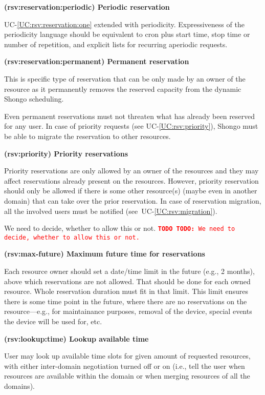\documentclass[a4paper]{report}
\makeatletter
\newcounter{UCcounter}
\newenvironment{UseCases}%
	{\begin{list}{\textbf{UC-\arabic{UCcounter}}}{\@nmbrlisttrue\def\@listctr{UCcounter}}}%
	{\end{list}}
\newcommand{\UClabel}[1]{\label{UC:#1}}
\newcommand{\UCref}[1]{UC-\ref{UC:#1}}
\newcommand{\UseCase}[2]{\item\UClabel{#2} \textbf{(#2) #1}\\ \nopagebreak}
\newcommand{\TODO}[1]{%
\def\empty{}%
\def\prvniparametr{#1}%
\ifx\prvniparametr\empty%
\begingroup\tt\textcolor{red}{\noindent\textbf{TODO}}\endgroup
\else%
\begingroup\tt\textcolor{red}{\noindent\textbf{TODO:}\ #1}\endgroup
\fi%
}
\makeatother
\begin{document}
\begin{UseCases}
\begin{compactitem}
\end{compactitem}



\UseCase{Periodic reservation}{rsv:reservation:periodic}

\UCref{rsv:reservation:one} extended with periodicity. Expressiveness of the
periodicity language should be equivalent to cron plus start time, stop time or number of repetition, and explicit lists for recurring aperiodic requests.

\UseCase{Permanent reservation}{rsv:reservation:permanent}

This is specific type of reservation that can be only made by an owner of the
resource as it permanently removes the reserved capacity from the dynamic
Shongo scheduling.

Even permanent reservations must not threaten what has already been reserved for any user. In case of priority requests (see \UCref{rsv:priority}), Shongo must be able to migrate the reservation to other resources.

\UseCase{Priority reservations}{rsv:priority}

Priority reservations are only allowed by an owner of the resources and they
may affect reservations already present on the resources. However, priority
reservation should only be allowed if there is some other resource(s) (maybe
even in another domain) that can take over the prior reservation. In case of
reservation migration, all the involved users must be notified
(see~\UCref{rsv:migration}).

\TODO{We need to decide, whether to allow this or not.}


\UseCase{Maximum future time for reservations}{rsv:max-future}

Each resource owner should set a date/time limit in the future (e.g., 2
months), above which reservations are not allowed. That should be done for each owned resource. Whole reservation duration
must fit in that limit. This limit ensures there is some time point in the
future, where there are no reservations on the resource---e.g., for
maintainance purposes, removal of the device, special events the device will be
used for, etc.


\UseCase{Lookup available time}{rsv:lookup:time}

User may look up available time slots for given amount of requested resources,
with either inter-domain negotiation turned off or on (i.e., tell the user when
resources are available within the domain or when merging resources of all the
domains).


\end{UseCases}
\end{document}

